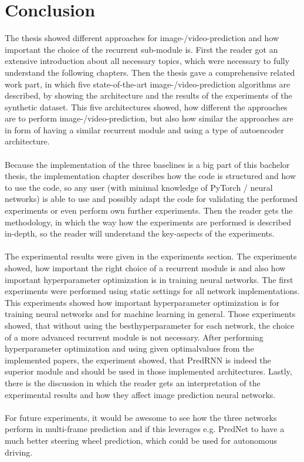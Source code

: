 \section{Conclusion} \label{section::conclusion}
 The thesis showed different approaches for image-/video-prediction and how important the choice of the recurrent sub-module is.
 First the reader got an extensive introduction
 about all necessary topics, which were necessary to fully understand the following chapters. Then the thesis gave a comprehensive related work part, in which
 five state-of-the-art image-/video-prediction algorithms are described, by showing the architecture and the results of the experiments of the synthetic dataset.
 This five architectures showed, how different the approaches are to perform image-/video-prediction, but also how similar the approaches are in form of
 having a similar recurrent module and using a type of autoencoder architecture.\\\\
 Because the implementation
 of the three baselines is a big part of this bachelor thesis, the implementation chapter describes how the code is structured and how to use the code, so any
 user (with minimal knowledge of PyTorch / neural networks) is able to use and possibly adapt the code for validating the performed experiments or even perform
 own further experiments. Then the reader gets the methodology, in which the way how the experiments are performed is described in-depth, so the reader will 
 understand the key-aspects of the experiments.\\\\
 The experimental results were given in the experiments section.
 The experiments showed, how important the right choice of a recurrent module is and also how important hyperparameter optimization is in training neural networks.
 The first experiments were performed using static settings for all network implementations. This experiments showed how important hyperparameter optimization
 is for training neural networks and for machine learning in general. Those experiments showed, that without using the \glqq best\grqq hyperparameter for each
 network, the choice of a more advanced recurrent module is not necessary. After performing hyperparameter optimization and using given \glqq optimal\grqq values 
 from the implemented papers, the experiment showed, that
 PredRNN is indeed the superior module and should be used in those implemented architectures. 
 Lastly, there is the discussion in which
 the reader gets an interpretation of the experimental results and how they affect image prediction neural networks.\\\\
 For future experiments, it would be awesome to see how the three networks perform in multi-frame prediction and if this leverages e.g. PredNet to have a much
 better steering wheel prediction, which could be used for autonomous driving.